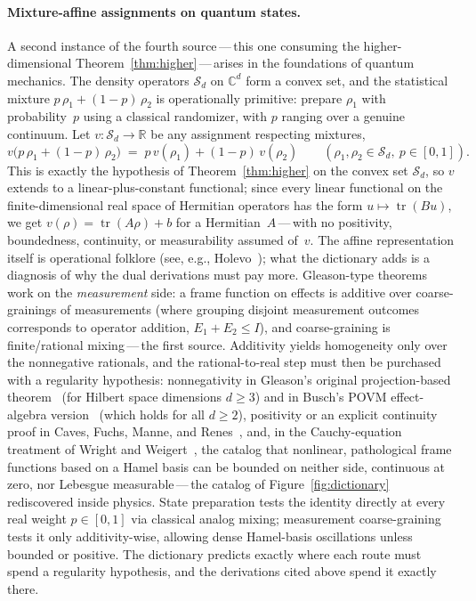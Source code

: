 \documentclass{article}
\theoremstyle{plain}
\theoremstyle{definition}
\newcommand{\R}{\mathbb{R}}
\begin{document}
\paragraph{Mixture-affine assignments on quantum states.}
A second instance of the fourth source\,---\,this one consuming the
higher-dimensional Theorem~\ref{thm:higher}\,---\,arises in the
foundations of quantum mechanics. The density operators
$\mathcal{S}_d$ on $\mathbb{C}^d$ form a convex set, and the
statistical mixture $p\,\rho_1+(1-p)\,\rho_2$ is operationally
primitive: prepare $\rho_1$ with probability~$p$ using a classical
randomizer, with $p$ ranging over a genuine continuum. Let
$v\colon\mathcal{S}_d\to\R$ be any assignment respecting mixtures,
\[
v\bigl(p\,\rho_1+(1-p)\,\rho_2\bigr)\;=\;p\,v(\rho_1)+(1-p)\,v(\rho_2)
\qquad(\rho_1,\rho_2\in\mathcal{S}_d,\ p\in[0,1]).
\]
This is exactly the hypothesis of Theorem~\ref{thm:higher} on the
convex set $\mathcal{S}_d$, so $v$ extends to a linear-plus-constant
functional; since every linear functional on the finite-dimensional
real space of Hermitian operators has the form
$u\mapsto\operatorname{tr}(Bu)$, we get
$v(\rho)=\operatorname{tr}(A\rho)+b$ for a Hermitian~$A$\,---\,with
no positivity, boundedness, continuity, or measurability assumed
of~$v$. The affine representation itself is operational folklore
(see, e.g., Holevo~\cite[Lemma~1.6.1]{Holevo1982}); what the
dictionary adds is a diagnosis of why the dual derivations must pay
more. Gleason-type theorems work on the \emph{measurement} side: a
frame function on effects is additive over coarse-grainings of
measurements (where grouping disjoint measurement outcomes corresponds to operator addition, $E_1 + E_2 \le I$), and coarse-graining is finite/rational mixing\,---\,the first
source. Additivity yields homogeneity only over the nonnegative
rationals, and the rational-to-real step must then be purchased with
a regularity hypothesis: nonnegativity in Gleason's original
projection-based theorem~\cite{Gleason1957} (for Hilbert space dimensions $d \ge 3$) and in Busch's POVM effect-algebra
version~\cite{Busch2003} (which holds for all $d \ge 2$), positivity or an explicit continuity proof
in Caves, Fuchs, Manne, and Renes~\cite{CFMR2004}, and, in the
Cauchy-equation treatment of Wright and
Weigert~\cite{WrightWeigert2019}, the catalog that nonlinear, pathological frame
functions based on a Hamel basis can be bounded on neither side, continuous at zero, nor
Lebesgue measurable\,---\,the catalog of Figure~\ref{fig:dictionary}
rediscovered inside physics. State preparation tests the identity directly at every
real weight $p \in [0,1]$ via classical analog mixing; measurement coarse-graining tests it only additivity-wise, allowing dense Hamel-basis oscillations unless bounded or positive. The dictionary
predicts exactly where each route must spend a regularity hypothesis, and the
derivations cited above spend it exactly there.
\end{document}
